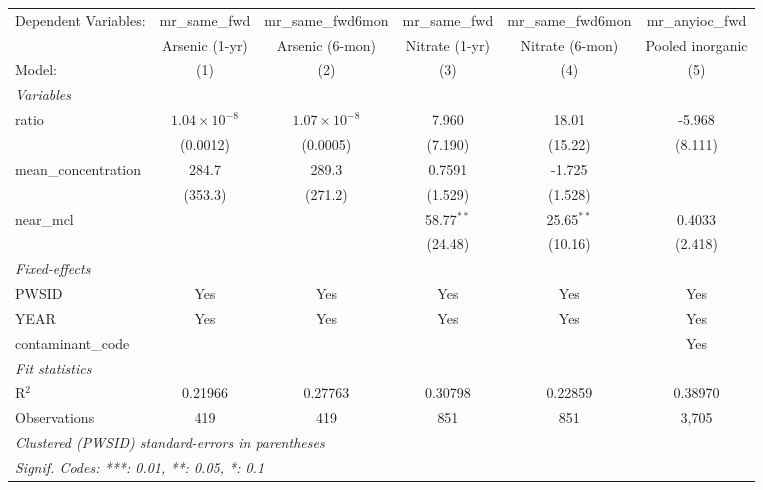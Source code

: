 \makeatletter
{}%
\makeatother

\begingroup
\centering
\begin{tabular}{lccccc}
   \tabularnewline \midrule \midrule
   Dependent Variables: & mr\_same\_fwd         & mr\_same\_fwd6mon     & mr\_same\_fwd   & mr\_same\_fwd6mon   & mr\_anyioc\_fwd\\    
                        & Arsenic (1-yr)        & Arsenic (6-mon)       & Nitrate (1-yr)  & Nitrate (6-mon)     & Pooled inorganic \\   
   Model:               & (1)                   & (2)                   & (3)             & (4)                 & (5)\\  
   \midrule
   \emph{Variables}\\
   ratio                & $1.04\times 10^{-8}$  & $1.07\times 10^{-8}$  & 7.960           & 18.01               & -5.968\\   
                        & (0.0012)              & (0.0005)              & (7.190)         & (15.22)             & (8.111)\\   
   mean\_concentration  & 284.7                 & 289.3                 & 0.7591          & -1.725              &   \\   
                        & (353.3)               & (271.2)               & (1.529)         & (1.528)             &   \\   
   near\_mcl            &                       &                       & 58.77$^{**}$    & 25.65$^{**}$        & 0.4033\\   
                        &                       &                       & (24.48)         & (10.16)             & (2.418)\\   
   \midrule
   \emph{Fixed-effects}\\
   PWSID                & Yes                   & Yes                   & Yes             & Yes                 & Yes\\  
   YEAR                 & Yes                   & Yes                   & Yes             & Yes                 & Yes\\  
   contaminant\_code    &                       &                       &                 &                     & Yes\\  
   \midrule
   \emph{Fit statistics}\\
   R$^2$                & 0.21966               & 0.27763               & 0.30798         & 0.22859             & 0.38970\\  
   Observations         & 419                   & 419                   & 851             & 851                 & 3,705\\  
   \midrule \midrule
   \multicolumn{6}{l}{\emph{Clustered (PWSID) standard-errors in parentheses}}\\
   \multicolumn{6}{l}{\emph{Signif. Codes: ***: 0.01, **: 0.05, *: 0.1}}\\
\end{tabular}
 
